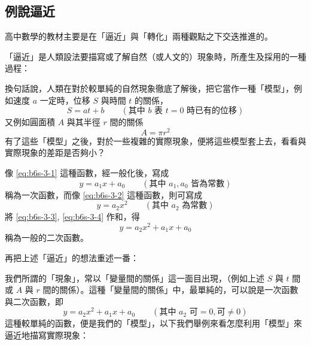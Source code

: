 \subsection{例說逼近}\label{sec:b6s-3-1}

高中數學的教材主要是在「逼近」與「轉化」兩種觀點之下交迭推進的。

「逼近」是人類設法要描寫或了解自然（或人文的）現象時，所產生及採用的一種過程：

換句話說，人類在對於較單純的自然現象徹底了解後，把它當作一種「模型」，例如速度 $a$ 一定時，位移 $S$ 與時間 $t$ 的關係，
\begin{equation}
S = at + b \qquad (\text{其中 } b \text{ 表 } t=0 \text{ 時已有的位移}) \label{eq:b6s-3-1}
\end{equation}
又例如圓面積 $A$ 與其半徑 $r$ 間的關係
\begin{equation}
A = \pi r^2 \label{eq:b6s-3-2}
\end{equation}
有了這些「模型」之後，對於一些複雜的實際現象，便將這些模型套上去，看看與實際現象的差距是否夠小？

像 \eqref{eq:b6s-3-1} 這種函數，經一般化後，寫成
\begin{equation}
y = a_1 x + a_0 \qquad (\text{其中 } a_1, a_0 \text{ 皆為常數}) \label{eq:b6s-3-3}
\end{equation}
稱為一次函數，而像 \eqref{eq:b6s-3-2} 這種函數，則可寫成
\begin{equation}
y = a_2 x^2 \qquad (\text{其中 } a_2 \text{ 為常數}) \label{eq:b6s-3-4}
\end{equation}
將 \eqref{eq:b6s-3-3}, \eqref{eq:b6s-3-4} 作和，得
\begin{equation}
y = a_2 x^2 + a_1 x + a_0 \label{eq:b6s-3-5}
\end{equation}
稱為一般的二次函數。

再把上述「逼近」的想法重述一番：

我們所謂的「現象」，常以「變量間的關係」這一面目出現，（例如上述 $S$ 與 $t$ 間或 $A$ 與 $r$ 間的關係）。這種「變量間的關係」中，最單純的，可以說是一次函數與二次函數，即
\[ y = a_2 x^2 + a_1 x + a_0 \qquad (\text{其中 } a_2 \text{ 可}=0, \text{可}\ne 0) \]
這種較單純的函數，便是我們的「模型」，以下我們舉例來看怎麼利用「模型」來逼近地描寫實際現象：

